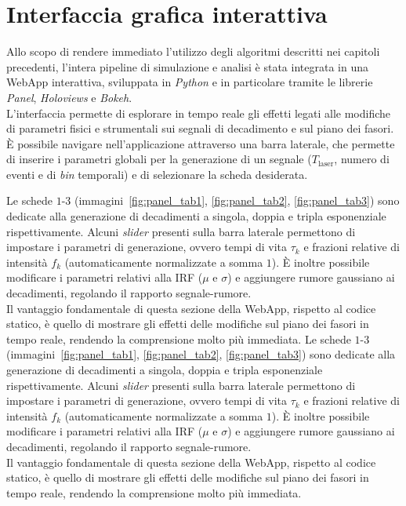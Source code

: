\chapter{Interfaccia grafica interattiva}
\label{sec:interfaccia_grafica_interattiva}

Allo scopo di rendere immediato l'utilizzo degli algoritmi descritti nei capitoli precedenti, l'intera pipeline di simulazione e analisi è stata integrata in una WebApp interattiva, sviluppata in \textit{Python} e in particolare tramite le librerie \textit{Panel}, \textit{Holoviews} e \textit{Bokeh}.\\
L'interfaccia permette di esplorare in tempo reale gli effetti legati alle modifiche di parametri fisici e strumentali sui segnali di decadimento e sul piano dei fasori.
È possibile navigare nell'applicazione attraverso una barra laterale, che permette di inserire i parametri globali per la generazione di un segnale ($T_{\text{laser}}$, numero di eventi e di \textit{bin} temporali) e di selezionare la scheda desiderata.

Le schede $1$-$3$ (immagini~\ref{fig:panel_tab1}, \ref{fig:panel_tab2}, \ref{fig:panel_tab3}) sono dedicate alla generazione di decadimenti a singola, doppia e tripla esponenziale rispettivamente. Alcuni \textit{slider} presenti sulla barra laterale permettono di impostare i parametri di generazione, ovvero tempi di vita $\tau_k$ e frazioni relative di intensità $f_k$ (automaticamente normalizzate a somma $1$). È inoltre possibile modificare i parametri relativi alla IRF ($\mu$ e $\sigma$) e aggiungere rumore gaussiano ai decadimenti, regolando il rapporto segnale-rumore.\\
Il vantaggio fondamentale di questa sezione della WebApp, rispetto al codice statico, è quello di mostrare gli effetti delle modifiche sul piano dei fasori in tempo reale, rendendo la comprensione molto più immediata.
Le schede $1$-$3$ (immagini~\ref{fig:panel_tab1}, \ref{fig:panel_tab2}, \ref{fig:panel_tab3}) sono dedicate alla generazione di decadimenti a singola, doppia e tripla esponenziale rispettivamente. Alcuni \textit{slider} presenti sulla barra laterale permettono di impostare i parametri di generazione, ovvero tempi di vita $\tau_k$ e frazioni relative di intensità $f_k$ (automaticamente normalizzate a somma $1$). È inoltre possibile modificare i parametri relativi alla IRF ($\mu$ e $\sigma$) e aggiungere rumore gaussiano ai decadimenti, regolando il rapporto segnale-rumore.\\
Il vantaggio fondamentale di questa sezione della WebApp, rispetto al codice statico, è quello di mostrare gli effetti delle modifiche sul piano dei fasori in tempo reale, rendendo la comprensione molto più immediata.

